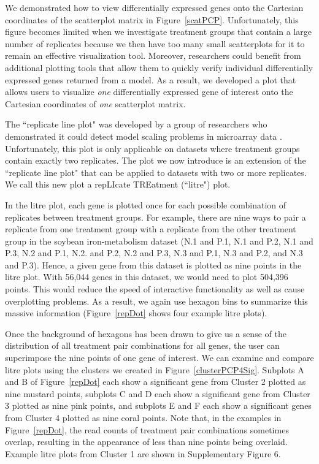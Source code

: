 \documentclass{bioinfo}
\begin{document}
We demonstrated how to view differentially expressed genes onto the Cartesian coordinates of the scatterplot matrix in Figure~\ref{scatPCP}. Unfortunately, this figure becomes limited when we investigate treatment groups that contain a large number of replicates because we then have too many small scatterplots for it to remain an effective visualization tool. Moreover, researchers could benefit from additional plotting tools that allow them to quickly verify individual differentially expressed genes returned from a model. As a result, we developed a plot that allows users to visualize \textit{one} differentially expressed gene of interest onto the Cartesian coordinates of \textit{one} scatterplot matrix.

The ``replicate line plot" was developed by a group of researchers who demonstrated it could detect model scaling problems in microarray data \citep{Cook}. Unfortunately, this plot is only applicable on datasets where treatment groups contain exactly two replicates. The plot we now introduce is an extension of the ``replicate line plot" that can be applied to datasets with two or more replicates. We call this new plot a repLIcate TREatment (``litre") plot.

In the litre plot, each gene is plotted once for each possible combination of replicates between treatment groups. For example, there are nine ways to pair a replicate from one treatment group with a replicate from the other treatment group in the soybean iron-metabolism dataset (N.1 and P.1, N.1 and P.2, N.1 and P.3, N.2 and P.1, N.2. and P.2, N.2 and P.3, N.3 and P.1, N.3 and P.2, and N.3 and P.3). Hence, a given gene from this dataset is plotted as nine points in the litre plot. With 56,044 genes in this dataset, we would need to plot 504,396 points. This would reduce the speed of interactive functionality as well as cause overplotting problems. As a result, we again use hexagon bins to summarize this massive information (Figure~\ref{repDot} shows four example litre plots).

Once the background of hexagons has been drawn to give us a sense of the distribution of all treatment pair combinations for all genes, the user can superimpose the nine points of one gene of interest. We can examine and compare litre plots using the clusters we created in Figure~\ref{clusterPCP4Sig}. Subplots A and B of Figure~\ref{repDot} each show a significant gene from Cluster 2 plotted as nine mustard points, subplots C and D each show a significant gene from Cluster 3 plotted as nine pink points, and subplots E and F each show a significant genes from Cluster 4 plotted as nine coral points. Note that, in the examples in Figure~\ref{repDot}, the read counts of treatment pair combinations sometimes overlap, resulting in the appearance of less than nine points being overlaid. Example litre plots from Cluster 1 are shown in Supplementary Figure 6.
\end{document}
